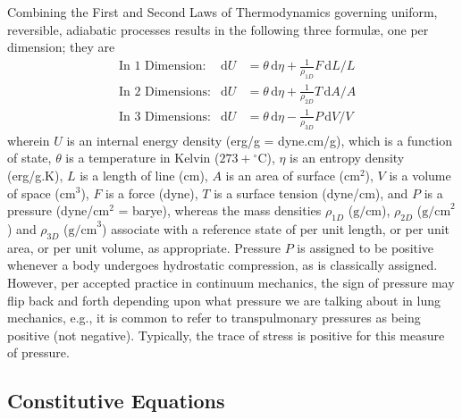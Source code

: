 Combining the First and Second Laws of Thermo\-dynamics governing uniform, reversible, adiabatic processes results in the following three formul\ae, one per dimension; they are
\begin{subequations}
    \label{thermoelasticLaws}
    \begin{align}
    \mbox{} & \text{In 1 Dimension:} & 
    \mathrm{d}U & = \theta \, \mathrm{d} \eta +
    \tfrac{1}{\rho_{1D}} F \, \mathrm{d}L / L
    \label{thermoelastic1Dlaw} \\
    \mbox{} & \text{In 2 Dimensions:} &
    \mathrm{d}U & = \theta \, \mathrm{d} \eta + 
    \tfrac{1}{\rho_{2D}} T \, \mathrm{d}A / \! A
    \label{thermoelastic2Dlaw} \\
    \mbox{} & \text{In 3 Dimensions:} &
    \mathrm{d}U & = \theta \, \mathrm{d} \eta - 
    \tfrac{1}{\rho_{3D}} P \, \mathrm{d}V \! / V \!
    \label{thermoelastic3Dlaw}
    \end{align}
\end{subequations}
wherein $U$ is an internal energy density (erg/g = dyne.cm/g), which is a function of state, $\theta$ is a temperature in Kelvin ($273 + \mbox{}^{\circ}$C), $\eta$ is an entropy density (erg/g.K), $L$ is a length of line (cm), $A$ is an area of surface ($\text{cm}^2$), $V$ is a volume of space ($\text{cm}^3$), $F$ is a force (dyne), $T$ is a surface tension (dyne/cm), and $P$ is a pressure (dyne/$\text{cm}^2$ = barye), whereas the mass densities $\rho_{1D}$ ($\text{g/cm}$), $\rho_{2D}$ ($\text{g/cm}^2$) and $\rho_{3D}$ ($\text{g/cm}^3$) associate with a reference state of per unit length, or per unit area, or per unit volume, as appropriate.  Pressure $P$ is assigned to be positive whenever a body undergoes hydro\-static compression, as is classically assigned.  However, per accepted practice in continuum mechanics, the sign of pressure may flip back and forth depending upon what pressure we are talking about in lung mechanics, e.g., it is common to refer to transpulmonary pressures as being positive (not negative). Typically, the trace of stress is positive for this measure of pressure.

\subsection{Constitutive Equations}

